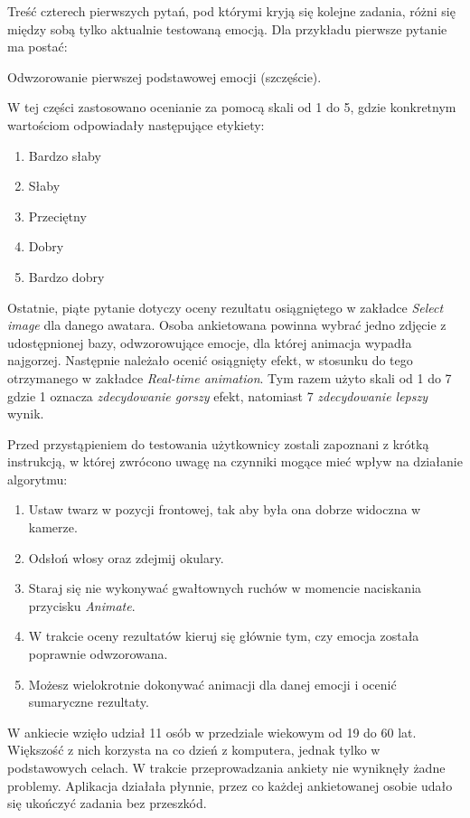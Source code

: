 Treść czterech pierwszych pytań, pod którymi kryją się kolejne zadania, różni się między sobą tylko aktualnie testowaną emocją. Dla przykładu pierwsze pytanie ma postać:
\begin{center}
    Odwzorowanie pierwszej podstawowej emocji (szczęście).
\end{center}

W tej części zastosowano ocenianie za pomocą skali od 1 do 5, gdzie konkretnym wartościom odpowiadały następujące etykiety:
\begin{enumerate}
    \item Bardzo słaby
    \item Słaby
    \item Przeciętny
    \item Dobry
    \item Bardzo dobry

\end{enumerate}

Ostatnie, piąte pytanie dotyczy oceny rezultatu osiągniętego w zakładce \textit{Select image} dla danego awatara. Osoba ankietowana powinna wybrać jedno zdjęcie z udostępnionej bazy, odwzorowujące emocje, dla której animacja wypadła najgorzej. Następnie należało ocenić osiągnięty efekt, w stosunku do tego otrzymanego w zakładce \textit{Real-time animation}. Tym razem użyto skali od 1 do 7 gdzie 1 oznacza \textit{zdecydowanie gorszy} efekt, natomiast 7 \textit{zdecydowanie lepszy} wynik.

Przed przystąpieniem do testowania użytkownicy zostali zapoznani z krótką instrukcją, w której zwrócono uwagę na czynniki mogące mieć wpływ na działanie algorytmu:

\begin{enumerate}
    \item Ustaw twarz w pozycji frontowej, tak aby była ona dobrze widoczna w kamerze.
    \item Odsłoń włosy oraz zdejmij okulary.
    \item Staraj się nie wykonywać gwałtownych ruchów w momencie naciskania przycisku \textit{Animate}.
    \item W trakcie oceny rezultatów kieruj się głównie tym, czy emocja została poprawnie odwzorowana.
    \item Możesz wielokrotnie dokonywać animacji dla danej emocji i ocenić sumaryczne rezultaty.
\end{enumerate}

W ankiecie wzięło udział 11 osób w przedziale wiekowym od 19 do 60 lat. Większość z nich korzysta na co dzień z komputera, jednak tylko w podstawowych celach. W trakcie przeprowadzania ankiety nie wyniknęły żadne problemy. Aplikacja działała płynnie, przez co każdej ankietowanej osobie udało się ukończyć zadania bez przeszkód.

